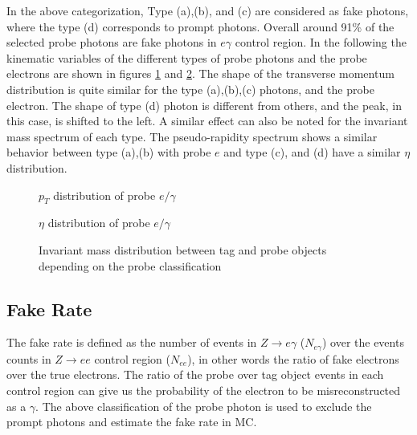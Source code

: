 In the above categorization, Type (a),(b), and (c) are considered as fake photons, where the type (d) corresponds to prompt photons. Overall around 91\% of the selected probe photons are fake photons in $e\gamma$ control region.
In the following the kinematic variables of the different types of probe photons and the probe electrons are shown in figures \ref{fig:mc_probe_pt} and \ref{fig:mc_probe_eta}. The shape of the transverse momentum distribution is quite similar for the type (a),(b),(c) photons, and the probe electron. The shape of type (d) photon is different from others, and the peak, in this case, is shifted to the left. A similar effect can also be noted for the invariant mass spectrum of each type. The pseudo-rapidity spectrum shows a similar behavior between type (a),(b) with probe $e$ and type (c), and (d) have a similar $\eta$ distribution.

\begin{figure}[htbp]
\begin{center}
\scalebox{0.7}{}
\caption{$p_{T}$ distribution of probe $e/\gamma$}
\label{fig:mc_probe_pt}
\end{center}
\end{figure}

\begin{figure}[htbp]
\begin{center}
\scalebox{0.7}{}
\caption{$\eta$ distribution of probe $e/\gamma$}
\label{fig:mc_probe_eta}
\end{center}
\end{figure}

\begin{figure}[htbp]
\begin{center}
\scalebox{0.7}{}
\caption{Invariant mass distribution between tag and probe objects depending on the probe classification}
\label{fig:mc_mass}
\end{center}
\end{figure}

\subsection{Fake Rate}

The fake rate is defined as the number of events in $Z\rightarrow e\gamma$ (\textit{$N_{e\gamma}$}) over the events counts in $Z \rightarrow ee$ control region (\textit{$N_{ee}$}), in other words the ratio of fake electrons over the true electrons. The ratio of the probe over tag object events in each control region can give us the probability of the electron to be misreconstructed as a $\gamma$. The above classification of the probe photon is used to exclude the prompt photons and estimate the fake rate in MC.

